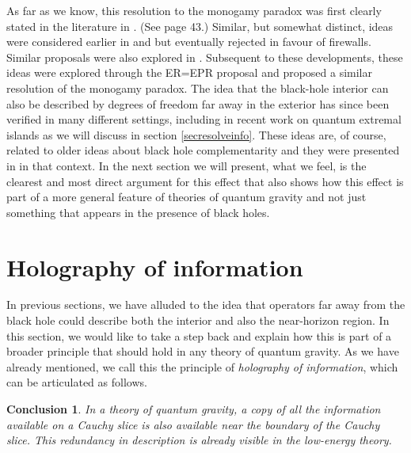 \documentclass[12pt]{article}
\newtheorem{lesson}{Conclusion}
\begin{document}
As far as we know, this resolution to the monogamy paradox was first clearly stated in the literature in \cite{Papadodimas:2012aq}. (See page 43.) Similar, but somewhat distinct, ideas were considered earlier in \cite{Bousso:2012as} and \cite{Susskind:2012uw} but eventually rejected in favour of firewalls. Similar proposals were also explored in  \cite{Nomura:2013gna,Nomura:2012sw,Verlinde:2012cy}. Subsequent to these developments, these ideas were explored through the ER=EPR proposal and  \cite{Maldacena:2013xja} proposed a similar resolution of the monogamy paradox.  The idea that the black-hole interior can also be described by degrees of freedom far away in the exterior has since been verified in many different settings, including in recent work on quantum extremal islands as we will discuss in section \ref{secresolveinfo}.  These ideas are, of course, related to older ideas about black hole complementarity \cite{'tHooft:1984re,Susskind:1993mu,Susskind:1993if} and they were presented in \cite{Papadodimas:2012aq} in that context. In the next section we will present, what we feel, is the clearest and most direct argument for this effect that also shows how this effect is part of a more general feature of theories of quantum gravity and not just something that appears in the presence of black holes.







\section{Holography of information \label{secholography}}
In previous sections, we have alluded to the idea that operators far
away from the black hole could describe both the interior and also the near-horizon region. 
In this section,  we would like to take a step back and explain 
how this is part of a broader principle that should hold in any 
theory of quantum gravity. As we have  already mentioned, we call this the principle of {\em holography of information}, which can be articulated as follows.
\begin{lesson}
\label{lessonholography}
In a theory of quantum gravity, a copy of all the information available on a Cauchy slice is also available near the boundary of the Cauchy slice. This redundancy in description is already visible in the low-energy theory.
\end{lesson}
\end{document}
